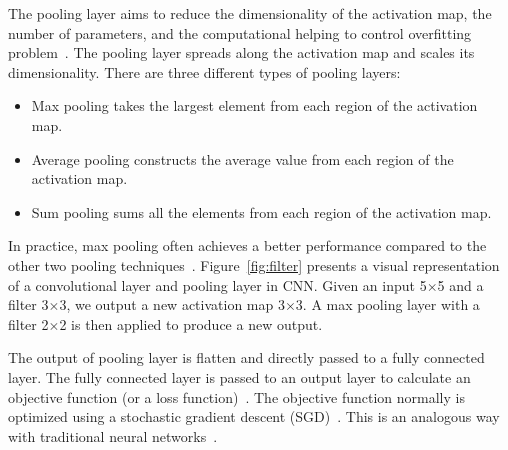 The pooling layer aims to reduce the dimensionality of the activation map, the number of parameters, and the computational helping to control overfitting problem~\cite{tolias2015particular}. The pooling layer spreads along the activation map and scales its dimensionality. There are three different types of pooling layers:
\begin{itemize}
	\item Max pooling takes the largest element from each region of the activation map.
	\item Average pooling constructs the average value from each region of the activation map.
	\item Sum pooling sums all the elements from each region of the activation map. 
\end{itemize}
In practice, max pooling often achieves a better performance compared to the other two pooling techniques~\cite{zeiler2013stochastic}. Figure~\ref{fig:filter} presents a visual representation of a convolutional layer and pooling layer in CNN. Given an input 5$\times$5 and a filter 3$\times$3, we output a new activation map 3$\times$3. A max pooling layer with a filter 2$\times$2 is then applied to produce a new output. 

The output of pooling layer is flatten and directly passed to a fully connected layer. The fully connected layer is passed to an output layer to calculate an objective function (or a loss function)~\cite{zhao2017loss}. The objective function normally is optimized using a stochastic gradient descent (SGD)~\cite{bottou2010large}. This is an analogous way with traditional neural networks~\cite{huang1988neural}.



